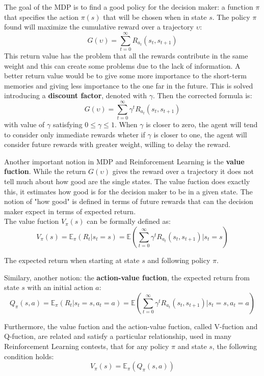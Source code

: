 \documentclass[14pt]{extarticle}
\def\ppn{\vspace{10pt}}
\begin{document}
\begin{flushleft}
\ppn
The goal of the MDP is to find a good policy for the decision maker: a function $\pi$ that specifies the action $\pi(s)$ that will be chosen when in state $s$. The policy $\pi$ found will maximize the cumulative reward over a trajectory $\upsilon$:
\[ G(\upsilon) = \sum_{t=0}^{\infty} R_{a_t}(s_t, s_{t+1}) \] 
This return value has the problem that all the rewards contribute in the same weight and this can create some problems due to the lack of information. A better return value would be to give some more importance to the short-term memories and giving less importance to the one far in the future. This is solved introducing a \textbf{discount factor}, denoted with $\gamma$. Then the corrected formula is:
\[ G(\upsilon) = \sum_{t=0}^{\infty} \gamma^t R_{a_t}(s_t, s_{t+1}) \]
with value of $\gamma$ satisfying $ 0 \leq \gamma \leq 1$. When $\gamma$ is closer to zero, the agent will tend to consider only immediate rewards wheter if $\gamma$ is closer to one, the agent will consider future rewards with greater weight, willing to delay the reward.

\ppn
Another important notion in MDP and Reinforcement Learning is the \textbf{value fuction}. While the return $G(\upsilon)$ gives the reward over a trajectory it does not tell much about how good are the single states. The value fuction does exactly this, it estimates how good is for the decision maker to be in a given state. The notion of "how good" is defined in terms of future rewards that can the decision maker expect in terms of expected return.
\\
The value fuction $V_{\pi}(s)$ can be formally defined as: 
\[V_{\pi}(s) = \mathbb{E}_{\pi}(R_t|s_t=s) = \mathbb{E}(\sum_{t=0}^{\infty} \gamma^t R_{a_t}(s_t, s_{t+1})|s_t=s)\]
\vspace{-9.3mm}
\begin{center}
The expected return when starting at state $s$ and following policy $\pi$.
\end{center}

Similary, another notion: the \textbf{action-value fuction}, the expected return from state $s$ with an initial action $a$:
\[Q_{\pi}(s,a) = \mathbb{E}_{\pi}(R_t|s_t=s, a_t=a) = \mathbb{E}(\sum_{t=0}^{\infty} \gamma^t R_{a_t}(s_t, s_{t+1})|s_t=s,a_t=a)\]

Furthermore, the value fuction and the action-value fuction, called V-fuction and Q-fuction, are related and satisfy a particular relationship, used in many Reinforcement Learning contests, that for any policy $\pi$ and state $s$, the following condition holds:
\[V_{\pi}(s) = \mathbb{E}_{\pi}(Q_{\pi}(s,a))\]


\end{flushleft}
\end{document}
